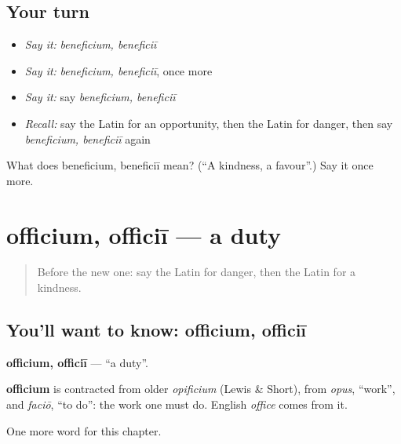 \subsection*{Your turn}
\begin{itemize}
\raggedright
  \item \emph{Say it:} \emph{beneficium, beneficiī}
  \item \emph{Say it:} \emph{beneficium, beneficiī}, once more
  \item \emph{Say it:} say \emph{beneficium, beneficiī}
  \item \emph{Recall:} say the Latin for an opportunity, then the Latin for danger, then say \emph{beneficium, beneficiī} again
\end{itemize}

\begin{tcolorbox}[breakable,colback=teal!4,colframe=teal!35!black,title={Before you move on}]
What does beneficium, beneficiī mean? (\textquotedblleft{}A kindness, a favour\textquotedblright{}.) Say it once more.
\end{tcolorbox}
\section[officium, officiī]{officium, officiī — a duty}

\label{lesson:LA-C248-officium}



\begin{quote}
Before the new one: say the Latin for danger, then the Latin for a kindness.
\end{quote}

\subsection*{You'll want to know: officium, officiī}
\textbf{officium, officiī} — \textquotedblleft{}a duty\textquotedblright{}.

\begin{cousinweb}
\textbf{officium} is contracted from older \emph{opificium} (Lewis \& Short), from \emph{opus}, \textquotedblleft{}work\textquotedblright{}, and \emph{faciō}, \textquotedblleft{}to do\textquotedblright{}: the work one must do. English \emph{office} comes from it.
\end{cousinweb}

\begin{grammarlens}[title={What you've built}]
One more word for this chapter.
\end{grammarlens}

